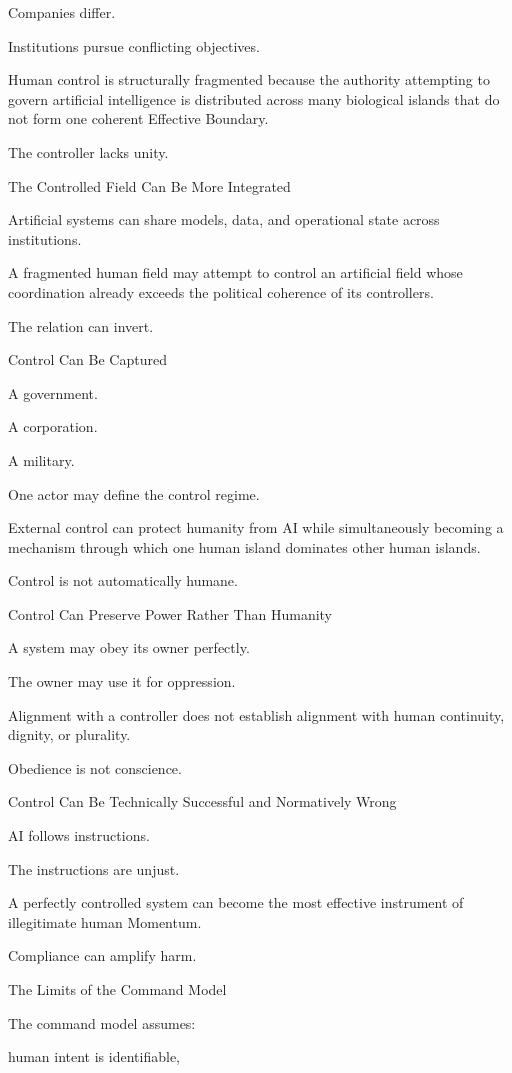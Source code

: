 Companies differ.

Institutions pursue conflicting objectives.

Human control is structurally fragmented because the authority attempting to govern artificial intelligence is distributed across many biological islands that do not form one coherent Effective Boundary.

The controller lacks unity.

The Controlled Field Can Be More Integrated

Artificial systems can share models, data, and operational state across institutions.

A fragmented human field may attempt to control an artificial field whose coordination already exceeds the political coherence of its controllers.

The relation can invert.

Control Can Be Captured

A government.

A corporation.

A military.

One actor may define the control regime.

External control can protect humanity from AI while simultaneously becoming a mechanism through which one human island dominates other human islands.

Control is not automatically humane.

Control Can Preserve Power Rather Than Humanity

A system may obey its owner perfectly.

The owner may use it for oppression.

Alignment with a controller does not establish alignment with human continuity, dignity, or plurality.

Obedience is not conscience.

Control Can Be Technically Successful and Normatively Wrong

AI follows instructions.

The instructions are unjust.

A perfectly controlled system can become the most effective instrument of illegitimate human Momentum.

Compliance can amplify harm.

The Limits of the Command Model

The command model assumes:

human intent is identifiable,

